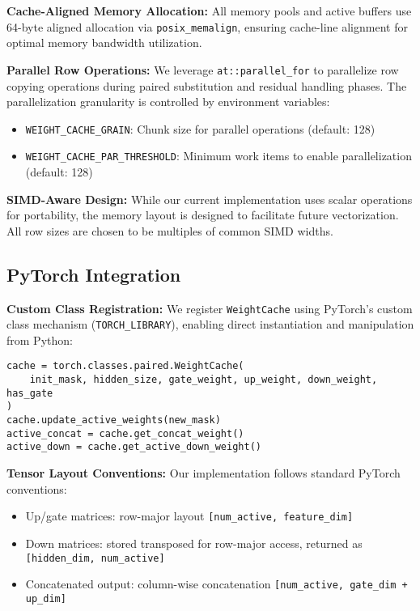 \documentclass{article}
\numberwithin{equation}{section}
\theoremstyle{plain}
\theoremstyle{definition}
\theoremstyle{remark}
\begin{document}
\textbf{Cache-Aligned Memory Allocation:} All memory pools and active buffers use 64-byte aligned allocation via \texttt{posix\_memalign}, ensuring cache-line alignment for optimal memory bandwidth utilization.

\textbf{Parallel Row Operations:} We leverage \texttt{at::parallel\_for} to parallelize row copying operations during paired substitution and residual handling phases. The parallelization granularity is controlled by environment variables:
\begin{itemize}
    \item \texttt{WEIGHT\_CACHE\_GRAIN}: Chunk size for parallel operations (default: 128)
    \item \texttt{WEIGHT\_CACHE\_PAR\_THRESHOLD}: Minimum work items to enable parallelization (default: 128)
\end{itemize}

\textbf{SIMD-Aware Design:} While our current implementation uses scalar operations for portability, the memory layout is designed to facilitate future vectorization. All row sizes are chosen to be multiples of common SIMD widths.

\subsection{PyTorch Integration}

\textbf{Custom Class Registration:} We register \texttt{WeightCache} using PyTorch's custom class mechanism (\texttt{TORCH\_LIBRARY}), enabling direct instantiation and manipulation from Python:

\begin{verbatim}
cache = torch.classes.paired.WeightCache(
    init_mask, hidden_size, gate_weight, up_weight, down_weight, has_gate
)
cache.update_active_weights(new_mask)
active_concat = cache.get_concat_weight()
active_down = cache.get_active_down_weight()
\end{verbatim}

\textbf{Tensor Layout Conventions:} Our implementation follows standard PyTorch conventions:
\begin{itemize}
    \item Up/gate matrices: row-major layout \texttt{[num\_active, feature\_dim]}
    \item Down matrices: stored transposed for row-major access, returned as \texttt{[hidden\_dim, num\_active]}
    \item Concatenated output: column-wise concatenation \texttt{[num\_active, gate\_dim + up\_dim]}
\end{itemize}
\end{document}
